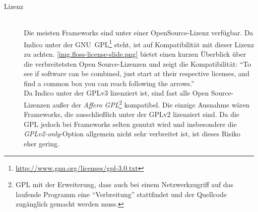 \begin{description}
\item[Lizenz] \hfill \\
Die meisten Frameworks sind unter einer OpenSource-Lizenz verfügbar.
Da Indico unter der
GNU~GPL\footnote{\href{http://www.gnu.org/licenses/gpl-3.0.txt}{http://www.gnu.org/licenses/gpl-3.0.txt}}
steht, ist auf Kompatibilität mit dieser Lizenz zu achten. \autoref{img.floss-license-slide.png}
bietet einen kurzen Überblick über die verbreitetsten Open Source-Lizenzen und zeigt die
Kompatibilität: \enquote{To see if software can be combined, just start at their respective
licenses, and find a common box you can reach following the arrows.} \citep{osslic} \\
Da Indico unter der GPLv3 lizenziert ist, sind fast alle Open Source-Lizenzen außer der \emph{Affero
GPL}\footnote{GPL mit der Erweiterung, dass auch bei einem Netzwerkzugriff auf das laufende Programm
eine \enquote{Verbreitung} stattfindet und der Quellcode zugänglich gemacht werden muss.}
kompatibel. Die einzige Ausnahme wären Frameworks, die ausschließlich unter der GPLv2 lizenziert
sind. Da die GPL jedoch bei Frameworks selten genutzt wird und insbesondere die
\emph{GPLv2-only}-Option allgemein nicht sehr verbreitet ist, ist dieses Risiko eher gering.
\end{description}





